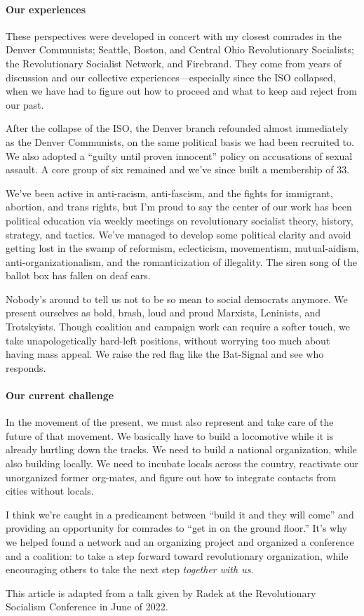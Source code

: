 \paragraph{Our experiences}

These perspectives were developed in concert with my closest comrades in the Denver Communists; Seattle, Boston, and Central Ohio Revolutionary Socialists; the Revolutionary Socialist Network, and Firebrand. They come from years of discussion and our collective experiences---especially since the ISO collapsed, when we have had to figure out how to proceed and what to keep and reject from our past.

After the collapse of the ISO, the Denver branch refounded almost immediately as the Denver Communists, on the same political basis we had been recruited to. We also adopted a ``guilty until proven innocent'' policy on accusations of sexual assault. A core group of six remained and we've since built a membership of 33.

We've been active in anti-racism, anti-fascism, and the fights for immigrant, abortion, and trans rights, but I'm proud to say the center of our work has been political education via weekly meetings on revolutionary socialist theory, history, strategy, and tactics. We've managed to develop some political clarity and avoid getting lost in the swamp of reformism, eclecticism, movementism, mutual-aidism, anti-organizationalism, and the romanticization of illegality. The siren song of the ballot box has fallen on deaf ears.

Nobody's around to tell us not to be so mean to social democrats anymore. We present ourselves as bold, brash, loud and proud Marxists, Leninists, and Trotskyists. Though coalition and campaign work can require a softer touch, we take unapologetically hard-left positions, without worrying too much about having mass appeal. We raise the red flag like the Bat-Signal and see who responds.

\paragraph{Our current challenge}

In the movement of the present, we must also represent and take care of the future of that movement. We basically have to build a locomotive while it is already hurtling down the tracks. We need to build a national organization, while also building locally. We need to incubate locals across the country, reactivate our unorganized former org-mates, and figure out how to integrate contacts from cities without locals.

I think we're caught in a predicament between ``build it and they will come'' and providing an opportunity for comrades to ``get in on the ground floor.'' It's why we helped found a network and an organizing project and organized a conference and a coalition: to take a step forward toward revolutionary organization, while encouraging others to take the next step \emph{together with us}.

This article is adapted from a talk given by Radek at the Revolutionary Socialism Conference in June of 2022.
